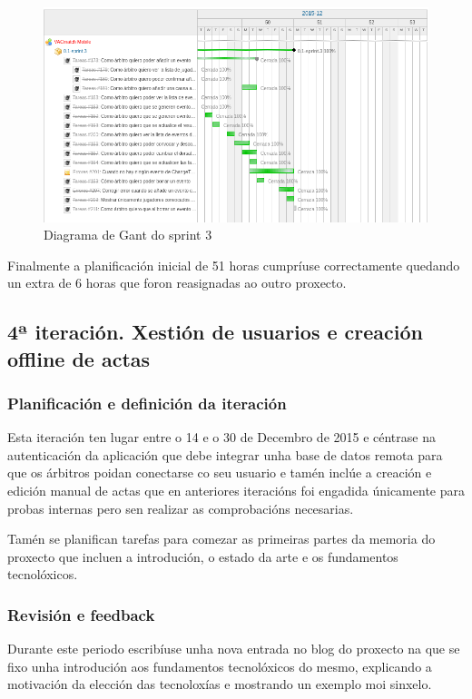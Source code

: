         \begin{figure}[h!]
          \begin{center}
          \includegraphics[width=\textwidth]{./img/gant_diagrams/03.png}
          \caption{Diagrama de Gant do sprint 3}
          \label{fig:gant03}
          \end{center}
        \end{figure}

        Finalmente a planificación inicial de 51 horas cumpríuse correctamente 
quedando un extra de 6 horas que foron reasignadas ao outro proxecto.

    \subsection{4ª iteración. Xestión de usuarios e creación offline de actas}

      \subsubsection{Planificación e definición da iteración}
      Esta iteración ten lugar entre o 14 e o 30 de Decembro de 2015 e céntrase 
na autenticación da aplicación que debe integrar unha base de datos remota para 
que os árbitros poidan conectarse co seu usuario e tamén inclúe a creación e 
edición manual de actas que en anteriores iteracións foi engadida únicamente 
para probas internas pero sen realizar as comprobacións necesarias.

      Tamén se planifican tarefas para comezar as primeiras partes da memoria 
do proxecto que incluen a introdución, o estado da arte e os fundamentos 
tecnolóxicos.

      \subsubsection{Revisión e feedback}
      Durante este periodo escribíuse unha nova entrada no blog do proxecto 
na que se fixo unha introdución aos fundamentos tecnolóxicos do mesmo, 
explicando a motivación da elección das tecnoloxías e mostrando un exemplo 
moi sinxelo.

